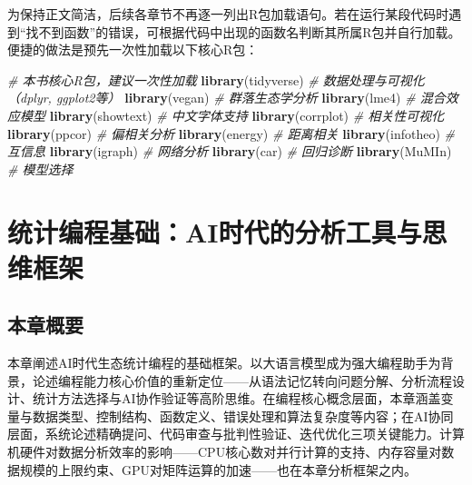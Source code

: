\documentclass[
  twoside,12pt,fontset=none]{ctexbook}
\newenvironment{Shaded}{\begin{snugshade}}{\end{snugshade}}
\newcommand{\CommentTok}[1]{\textcolor[rgb]{0.56,0.35,0.01}{\textit{#1}}}
\newcommand{\FunctionTok}[1]{\textcolor[rgb]{0.13,0.29,0.53}{\textbf{#1}}}
\newcommand{\NormalTok}[1]{#1}
\begin{document}
为保持正文简洁，后续各章节不再逐一列出R包加载语句。若在运行某段代码时遇到``找不到函数''的错误，可根据代码中出现的函数名判断其所属R包并自行加载。便捷的做法是预先一次性加载以下核心R包：

\begin{Shaded}
\begin{Highlighting}[]
\CommentTok{\# 本书核心R包，建议一次性加载}
\FunctionTok{library}\NormalTok{(tidyverse)    }\CommentTok{\# 数据处理与可视化（dplyr, ggplot2等）}
\FunctionTok{library}\NormalTok{(vegan)        }\CommentTok{\# 群落生态学分析}
\FunctionTok{library}\NormalTok{(lme4)         }\CommentTok{\# 混合效应模型}
\FunctionTok{library}\NormalTok{(showtext)     }\CommentTok{\# 中文字体支持}
\FunctionTok{library}\NormalTok{(corrplot)     }\CommentTok{\# 相关性可视化}
\FunctionTok{library}\NormalTok{(ppcor)        }\CommentTok{\# 偏相关分析}
\FunctionTok{library}\NormalTok{(energy)       }\CommentTok{\# 距离相关}
\FunctionTok{library}\NormalTok{(infotheo)     }\CommentTok{\# 互信息}
\FunctionTok{library}\NormalTok{(igraph)       }\CommentTok{\# 网络分析}
\FunctionTok{library}\NormalTok{(car)          }\CommentTok{\# 回归诊断}
\FunctionTok{library}\NormalTok{(MuMIn)        }\CommentTok{\# 模型选择}
\end{Highlighting}
\end{Shaded}

\hypertarget{ux7edfux8ba1ux7f16ux7a0bux57faux7840aiux65f6ux4ee3ux7684ux5206ux6790ux5de5ux5177ux4e0eux601dux7ef4ux6846ux67b6}{%
\chapter{统计编程基础：AI时代的分析工具与思维框架}\label{ux7edfux8ba1ux7f16ux7a0bux57faux7840aiux65f6ux4ee3ux7684ux5206ux6790ux5de5ux5177ux4e0eux601dux7ef4ux6846ux67b6}}

\hypertarget{ux672cux7ae0ux6982ux8981}{%
\section{本章概要}\label{ux672cux7ae0ux6982ux8981}}

本章阐述AI时代生态统计编程的基础框架。以大语言模型成为强大编程助手为背景，论述编程能力核心价值的重新定位------从语法记忆转向问题分解、分析流程设计、统计方法选择与AI协作验证等高阶思维。在编程核心概念层面，本章涵盖变量与数据类型、控制结构、函数定义、错误处理和算法复杂度等内容；在AI协同层面，系统论述精确提问、代码审查与批判性验证、迭代优化三项关键能力。计算机硬件对数据分析效率的影响------CPU核心数对并行计算的支持、内存容量对数据规模的上限约束、GPU对矩阵运算的加速------也在本章分析框架之内。
\end{document}
